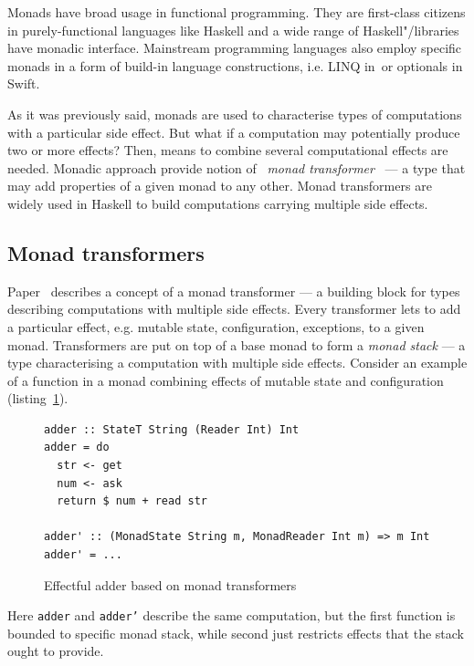     Monads have broad usage in functional programming. They are first-class citizens
    in purely-functional languages like Haskell and a wide range of Haskell"/libraries have monadic interface. Mainstream programming languages also
    employ specific monads in a form of build-in language constructions,
    i.e. LINQ in~\cs or optionals in Swift.

    As it was previously said, monads are used to characterise types of computations with a particular side effect. But what if a computation may
    potentially produce two or more effects? Then, means to combine several
    computational effects are needed. Monadic approach provide notion of
    ~\emph{monad transformer}~\cite{Liang:1995:MTM:199448.199528} --- a type that
    may add properties of a given monad to any other. Monad transformers are widely
    used in Haskell to build computations carrying multiple side effects.

    \subsection{Monad transformers}

      Paper~\cite{Liang:1995:MTM:199448.199528} describes a concept of a monad
      transformer --- a building block for types describing computations with
      multiple side effects. Every transformer lets to add a particular
      effect, e.g. mutable state, configuration, exceptions, to a given monad.
      Transformers are put on top of a base monad to form a \emph{monad stack} --- a
      type characterising a computation with multiple side effects. Consider
      an example of a function in a monad combining effects of mutable state and
      configuration (listing~\ref{listing:mtlAdder}).

      \begin{figure}[h]
      \begin{lstlisting}
adder :: StateT String (Reader Int) Int
adder = do
  str <- get
  num <- ask
  return $ num + read str

adder' :: (MonadState String m, MonadReader Int m) => m Int
adder' = ...
      \end{lstlisting}
      \caption{Effectful adder based on monad transformers}
      \label{listing:mtlAdder}
      \end{figure}

      Here \texttt{adder} and \texttt{adder'} describe the same computation, but the first
      function is bounded to specific monad stack, while second just restricts effects
      that the stack ought to provide.

